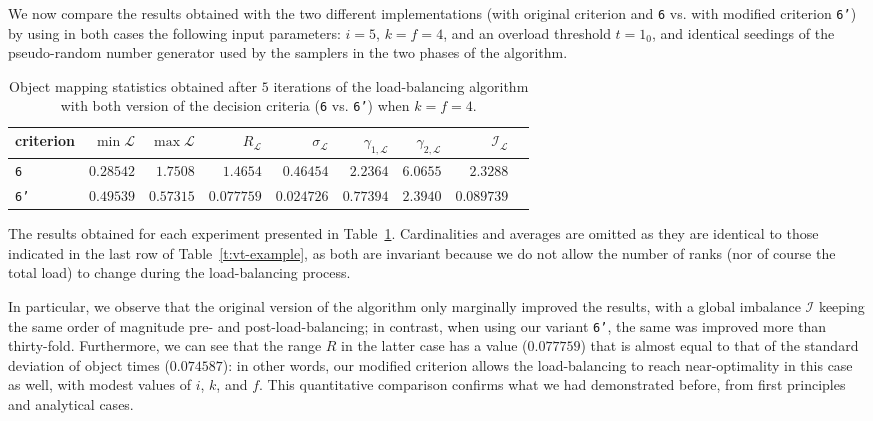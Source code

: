 We now compare the results obtained with the two different
implementations (with original criterion and
\texttt{6} vs. with modified criterion \texttt{6'}) by
using in both cases the following input parameters: $i=5$, $k=f=4$,
and an overload threshold $t=1_0$, and identical seedings of the
pseudo-random number generator used by the samplers in the two phases
of the algorithm.

\begin{table}[htb!]
\begin{center}
\begin{tabular}{@{}lrrrrrrrr@{}}
\hline
criterion &
$\min{\mathcal{L}}$ &
$\max{\mathcal{L}}$ &
$R_{\mathcal{L}}$ &
$\sigma_{\mathcal{L}}$ &
$\gamma_{1,\mathcal{L}}$ &
$\gamma_{2,\mathcal{L}}$ &
$\mathcal{I}_{\mathcal{L}}$ \\
\hline\hline
\texttt{6} &
$0.28542$ & $1.7508$ & $1.4654$ &
$0.46454$ & $2.2364$ & $6.0655$ &
$2.3288$  \\\hline
\texttt{6'} &
$0.49539$  & $0.57315$ & $0.077759$ &
$0.024726$ & $0.77394$ & $2.3940$ &
$0.089739$ \\\hline
\end{tabular}
\end{center}
\caption{\label{t:comparative_results} Object mapping statistics
obtained after $5$ iterations of the load-balancing algorithm with
both version of the decision criteria (\texttt{6} vs. \texttt{6'})
when $k=f=4$.}
\end{table}

The results obtained for each experiment  presented in
Table~\ref{t:comparative_results}. Cardinalities and averages are
omitted as they are identical to those indicated in the last row of
Table~\ref{t:vt-example}, as both are invariant because we do not
allow the number of ranks (nor of course the total load) to change
during the load-balancing process.

In particular, we observe that the original version of the algorithm
only marginally improved the results, with a global imbalance
$\mathcal{I}$ keeping the same order of magnitude pre- and
post-load-balancing; in contrast, when using our variant \texttt{6'}, the
same was improved more than thirty-fold.
Furthermore, we can see that the range $R$ in the latter case has a
value ($0.077759$) that is almost equal to that of the standard
deviation of object times ($0.074587$): in other words, our modified
criterion allows the load-balancing to reach near-optimality in this
case as well, with modest values of $i$, $k$, and $f$.
This quantitative comparison confirms what we had demonstrated before,
from first principles and analytical cases.

